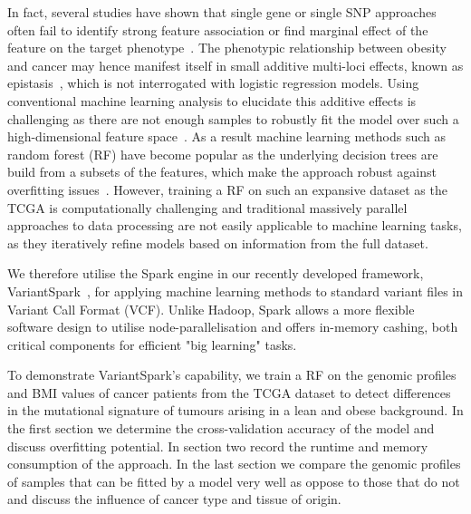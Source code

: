 \documentclass{llncs}
\newcommand{\variantSpark}{{\sc VariantSpark}}
\begin{document}
{In fact, several studies have shown that single gene or single SNP approaches often fail to identify strong feature association or find marginal effect of the feature on the target phenotype~\cite{Bureau2005,Yoo2012,Qi2012}. 
The phenotypic relationship between obesity and cancer may hence manifest itself in small additive multi-loci effects, known as epistasis~\cite{Mackay2014}, which is not interrogated with logistic regression models.
Using conventional machine learning analysis to elucidate this additive effects is challenging as there are not enough samples to robustly fit the model over such a high-dimensional feature space~\cite{Chen2012}. 
As a result machine learning methods such as random forest (RF) have become popular as the underlying decision trees are build from a subsets of the features, which make the approach robust against overfitting issues~\cite{Breiman2001}. 
However, training a RF on such an expansive dataset as the TCGA is computationally challenging and traditional massively parallel approaches to data processing are not easily applicable to machine learning tasks, as they iteratively refine models based on information from the full dataset. 

We therefore utilise the {\sc Spark} engine in our recently developed framework, \variantSpark~\cite{OBrien}, for applying machine learning methods to standard variant files in Variant Call Format (VCF). 
Unlike {\sc Hadoop}, {\sc Spark} allows a more flexible software design to utilise node-parallelisation and offers in-memory cashing, both critical components for efficient "big learning" tasks. 

To demonstrate \variantSpark's capability, we train a RF on the genomic profiles and BMI values of cancer patients from the TCGA dataset to detect differences in the mutational signature of tumours arising in a lean and obese background. 
In the first section we determine the cross-validation accuracy of the model and discuss overfitting potential. 
In section two record the runtime and memory consumption of the approach. 
In the last section we compare the genomic profiles of samples that can be fitted by a model very well as oppose to those that do not and discuss the influence of cancer type and tissue of origin. 









}
\end{document}
